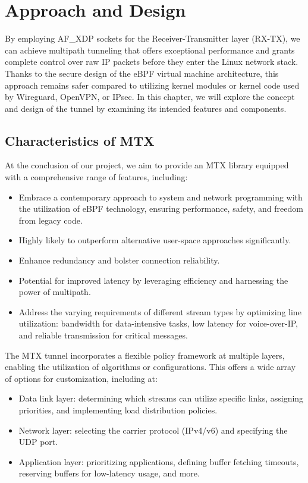\chapter{Approach and Design}\label{sec:approach_design}\minitoc\vspace{.5cm}

By employing AF\_XDP sockets for the Receiver-Transmitter layer (RX-TX), we can achieve multipath tunneling that offers exceptional performance and grants complete control over raw IP packets before they enter the Linux network stack. 
Thanks to the secure design of the eBPF virtual machine architecture, this approach remains safer compared to utilizing kernel modules or kernel code used by Wireguard, OpenVPN, or IPsec.
In this chapter, we will explore the concept and design of the tunnel by examining its intended features and components.

\section{Characteristics of MTX}
At the conclusion of our project, we aim to provide an MTX library equipped with a comprehensive range of features, including:

\begin{itemize}
	\item Embrace a contemporary approach to system and network programming with the utilization of eBPF technology, ensuring performance, safety, and freedom from legacy code.
	\item Highly likely to outperform alternative user-space approaches significantly.
	\item Enhance redundancy and bolster connection reliability.
	\item Potential for improved latency by leveraging efficiency and harnessing the power of multipath.
	\item Address the varying requirements of different stream types by optimizing line utilization: bandwidth for data-intensive tasks, low latency for voice-over-IP, and reliable transmission for critical messages.
\end{itemize}

The MTX tunnel incorporates a flexible policy framework at multiple layers, enabling the utilization of algorithms or configurations. 
This offers a wide array of options for customization, including at:
\begin{itemize}
	\item Data link layer: determining which streams can utilize specific links, assigning priorities, and implementing load distribution policies.
	\item Network layer: selecting the carrier protocol (IPv4/v6) and specifying the UDP port.
	\item Application layer: prioritizing applications, defining buffer fetching timeouts, reserving buffers for low-latency usage, and more.
\end{itemize}

